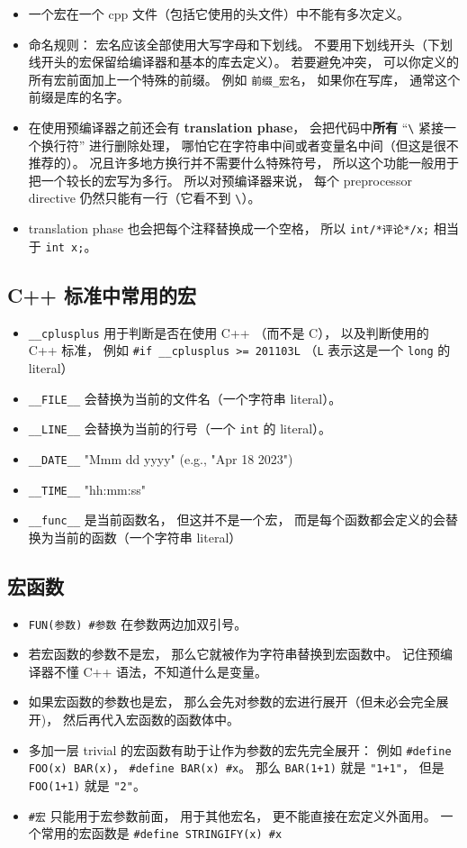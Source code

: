 \begin{itemize}
\item 一个宏在一个 cpp 文件（包括它使用的头文件）中不能有多次定义。
\item 命名规则： 宏名应该全部使用大写字母和下划线。 不要用下划线开头（下划线开头的宏保留给编译器和基本的库去定义）。 若要避免冲突， 可以你定义的所有宏前面加上一个特殊的前缀。 例如 \verb|前缀_宏名|， 如果你在写库， 通常这个前缀是库的名字。
\item 在使用预编译器之前还会有 \textbf{translation phase}， 会把代码中\textbf{所有} “\verb|\| 紧接一个换行符” 进行删除处理， 哪怕它在字符串中间或者变量名中间（但这是很不推荐的）。 况且许多地方换行并不需要什么特殊符号， 所以这个功能一般用于把一个较长的宏写为多行。 所以对预编译器来说， 每个 preprocessor directive 仍然只能有一行（它看不到 \verb|\|）。
\item translation phase 也会把每个注释替换成一个空格， 所以 \verb|int/*评论*/x;| 相当于 \verb|int x;|。
\end{itemize}

\subsection{C++ 标准中常用的宏}
\begin{itemize}
\item \verb|__cplusplus| 用于判断是否在使用 C++ （而不是 C）， 以及判断使用的 C++ 标准， 例如 \verb|#if __cplusplus >= 201103L| （\verb|L| 表示这是一个 \verb|long| 的 literal）
\item \verb|__FILE__| 会替换为当前的文件名（一个字符串 literal）。
\item \verb|__LINE__| 会替换为当前的行号（一个 \verb|int| 的 literal）。
\item \verb|__DATE__| "Mmm dd yyyy" (e.g., "Apr 18 2023")
\item \verb|__TIME__| "hh:mm:ss"
\item \verb|__func__| 是当前函数名， 但这并不是一个宏， 而是每个函数都会定义的会替换为当前的函数（一个字符串 literal）
\end{itemize}

\subsection{宏函数}
\begin{itemize}
\item \verb|FUN(参数) #参数| 在参数两边加双引号。
\item 若宏函数的参数不是宏， 那么它就被作为字符串替换到宏函数中。 记住预编译器不懂 C++ 语法，不知道什么是变量。
\item 如果宏函数的参数也是宏， 那么会先对参数的宏进行展开（但未必会完全展开)， 然后再代入宏函数的函数体中。
\item 多加一层 trivial 的宏函数有助于让作为参数的宏先完全展开： 例如 \verb|#define FOO(x) BAR(x)|， \verb|#define BAR(x) #x|。 那么 \verb|BAR(1+1)| 就是 \verb|"1+1"|， 但是 \verb|FOO(1+1)| 就是 \verb|"2"|。
\item \verb|#宏| 只能用于宏参数前面， 用于其他宏名， 更不能直接在宏定义外面用。 一个常用的宏函数是 \verb|#define STRINGIFY(x) #x|
\end{itemize}
